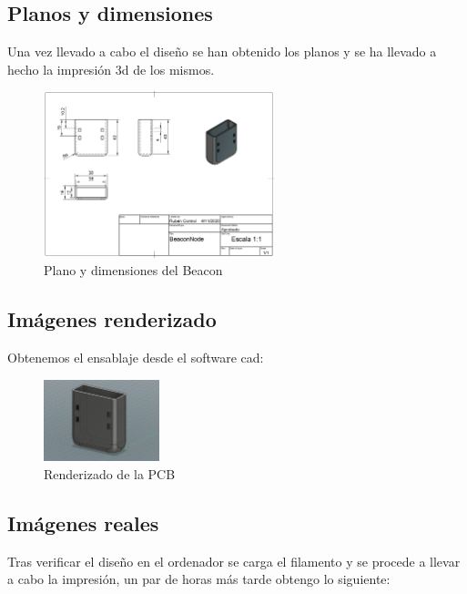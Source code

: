 \documentclass[a4paper ,12pt, onecolumn]{article}
\begin{document}
    \subsection{Planos y dimensiones}
        Una vez llevado a cabo el diseño se han obtenido los planos y se ha llevado a hecho la impresión 3d de los mismos.
        \begin{center}
            \begin{figure}[h]
                \centering
                \includegraphics[width=0.6\textwidth]{../model_beacon.PNG}
                \caption{Plano y dimensiones del Beacon}
                \label{fig:mesh1}
            \end{figure}
        \end{center}
    \subsection{Imágenes renderizado}
        Obtenemos el ensablaje desde el software cad:
        \begin{center}
            \begin{figure}[h]
                \centering
                \includegraphics[width=0.3\textwidth]{../mechanical_beacon.PNG}
                \caption{Renderizado de la PCB}
                \label{fig:mesh1}
            \end{figure}
        \end{center}

    \subsection{Imágenes reales}
        Tras verificar el diseño en el ordenador se carga el filamento y se procede a llevar a cabo la impresión, un par de horas más tarde
        obtengo lo siguiente:
\end{document}
